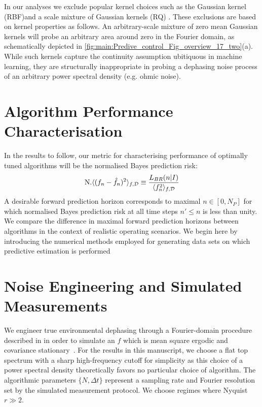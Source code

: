\documentclass[pra, reprint]{revtex4-1}
\begin{document}
In our analyses we exclude popular kernel choices such as the Gaussian kernel (RBF)and  a scale mixture of Gaussian kernels (RQ) \cite{rasmussen2005gaussian, tobar2015learning}. These exclusions are based on kernel properties as follows. An arbitrary-scale mixture of zero mean Gaussian kernels will probe an arbitrary area around zero in the Fourier domain, as schematically depicted in \cref{fig:main:Predive_control_Fig_overview_17_two}(a). While such kernels capture the continuity assumption ubitiquous in machine learning, they are structurally inappropriate in probing a dephasing noise process of an arbitrary power spectral density (e.g. ohmic noise).  


\section{Algorithm Performance Characterisation \label{sec:main:Performance}}

In the results to follow, our metric for characterising performance of optimally tuned algorithms will be the normalised Bayes prediction risk:
\begin{align}
\text{N.} \langle (f_n - \hat{f}_n)^2 \rangle_{f, \mathcal{D}} \equiv \frac{L_{BR}(n|I)}{\langle f_n^2 \rangle_{f, \mathcal{D}}} 
\end{align}
A desirable forward prediction horizon corresponds to maximal $n \in [0, N_P]$ for which normalised Bayes prediction risk at all time steps $n' \leq n$ is less than unity. We compare the difference in maximal forward prediction horizons between algorithms in the context of realistic operating scenarios.  We begin here by introducing the numerical methods employed for generating data sets on which predictive estimation is performed


\section{Noise Engineering and Simulated Measurements\label{sec:main:NoiseEngineering}}

We engineer true environmental dephasing through a Fourier-domain procedure described in \cite{soare2014} in order to simulate an $f$ which is mean square ergodic and covariance stationary~\cite{gelb1974applied}.  For the results in this manuscript, we choose a flat top spectrum with a sharp high-frequency cutoff for simplicity as this choice of a power spectral density theoretically favors no particular choice of algorithm. The algorithmic parameters $\{N, \Delta t\} $ represent a sampling rate and Fourier resolution set by the simulated measurement protocol. We choose regimes where Nyquist $r \gg 2$.
\end{document}
